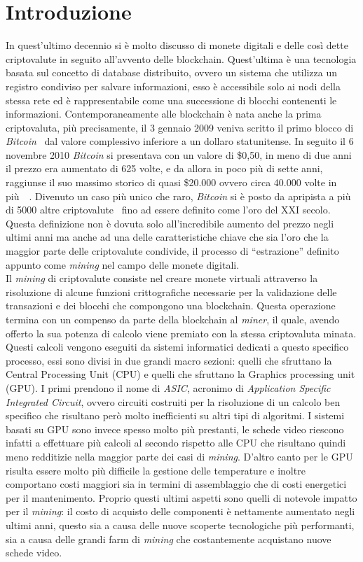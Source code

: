 \documentclass[
11pt, %
oneside, %
italian, %
onehalfspacing,%
headsepline, %
]{MastersDoctoralThesis} %
\begin{document}
{\chapter{Introduzione}}
In quest'ultimo decennio si è molto discusso di monete digitali e delle così dette criptovalute in seguito all'avvento delle blockchain. Quest'ultima è una tecnologia basata sul concetto di database distribuito, ovvero un sistema che utilizza un registro condiviso per salvare informazioni, esso è accessibile solo ai nodi della stessa rete ed è rappresentabile come una successione di blocchi contenenti le informazioni. Contemporaneamente alle blockchain è nata anche la prima criptovaluta, più precisamente, il 3 gennaio 2009 veniva scritto il primo blocco di \emph{Bitcoin}~\citep{kharraz2019outguard} dal valore complessivo inferiore a un dollaro statunitense. In seguito il 6 novembre 2010 \emph{Bitcoin} si presentava con un valore di \$0,50, in meno di due anni il prezzo era aumentato di 625 volte, e da allora in poco più di sette anni, raggiunse il suo massimo storico di quasi \$20.000 ovvero circa 40.000 volte in più~\citep{bitcoinwiki}~\citep{wiredbitcoin}. Divenuto un caso più unico che raro, \emph{Bitcoin} si è posto da apripista a più di 5000 altre criptovalute~\citep{coinlore} fino ad essere definito come l'oro del \RN{21} secolo. Questa definizione non è dovuta solo all'incredibile aumento del prezzo negli ultimi anni ma anche ad una delle caratteristiche chiave che sia l'oro che la maggior parte delle criptovalute condivide, il processo di ``estrazione'' definito appunto come \emph{mining} nel campo delle monete digitali.\\
Il \emph{mining} di criptovalute consiste nel creare monete virtuali attraverso la risoluzione di alcune funzioni crittografiche necessarie per la validazione delle transazioni e dei blocchi che compongono una blockchain. Questa operazione termina con un compenso da parte della blockchain al \emph{miner}, il quale, avendo offerto la sua potenza di calcolo viene premiato con la stessa criptovaluta minata. Questi calcoli vengono eseguiti da sistemi informatici dedicati a questo specifico processo, essi sono divisi in due grandi macro sezioni: quelli che sfruttano la Central Processing Unit (CPU) e quelli che sfruttano la Graphics processing unit (GPU). I primi prendono il nome di \emph{ASIC}, acronimo di \emph{Application Specific Integrated Circuit}, ovvero circuiti costruiti per la risoluzione di un calcolo ben specifico che risultano però molto inefficienti su altri tipi di algoritmi. I sistemi basati su GPU sono invece spesso molto più prestanti, le schede video riescono infatti a effettuare più calcoli al secondo rispetto alle CPU che risultano quindi meno redditizie nella maggior parte dei casi di \emph{mining}. D'altro canto per le GPU risulta essere molto più difficile la gestione delle temperature e inoltre comportano costi maggiori sia in termini di assemblaggio che di costi energetici per il mantenimento. Proprio questi ultimi aspetti sono quelli di notevole impatto per il \emph{mining}: il costo di acquisto delle componenti è nettamente aumentato negli ultimi anni, questo sia a causa delle nuove scoperte tecnologiche più performanti, sia a causa delle grandi farm di \emph{mining} che costantemente acquistano nuove schede video.\\
\end{document}
